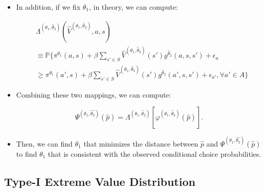 \documentclass[]{book}
\providecommand{\tightlist}{%
  \setlength{\itemsep}{0pt}\setlength{\parskip}{0pt}}
\begin{document}
\begin{itemize}
\tightlist
\item
  In addition, if we fix \(\theta_1\), in theory, we can compute:

  \begin{equation}
  \begin{split}
  &\Lambda^{(\theta_1, \hat{\theta}_2)}(\hat{V}^{(\theta_1, \hat{\theta}_2)}, a, s)\\
  &\equiv \mathbb{P}\Bigg\{\pi^{\theta_1}(a , s) + \beta \sum_{s' \in S} \hat{V}^{(\theta_1, \hat{\theta}_2)}(s') g^{\hat{\theta}_2}(a, s, s') + \epsilon_a\\
  &\ge \pi^{\theta_1}(a' , s) + \beta \sum_{s' \in S} \hat{V}^{(\theta_1, \hat{\theta}_2)}(s') g^{\hat{\theta}_2}(a', s, s') + \epsilon_{a'}, \forall a' \in A \Bigg\}
  \end{split}
  \end{equation}
\item
  Combining these two mappings, we can compute:

  \begin{equation}
  \Psi^{(\theta_1, \hat{\theta_2})}(\hat{p}) = \Lambda^{(\theta_1, \hat{\theta}_2)}[\varphi^{(\theta_1, \hat{\theta}_2)}(\hat{p})].
  \end{equation}
\item
  Then, we can find \(\theta_1\) that minimizes the distance between
  \(\hat{p}\) and \(\Psi^{(\theta_1, \hat{\theta_2})}(\hat{p})\) to find
  \(\theta_1\) that is consistent with the observed conditional choice
  probabilities.
\end{itemize}

\subsection{Type-I Extreme Value
Distribution}\label{type-i-extreme-value-distribution}
\end{document}
